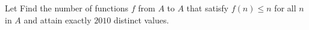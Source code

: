 Let   Find the number of functions $f$ from $A$ to $A$ that satisfy $f(n) \le n$ for all $n$ in $A$ and attain exactly $2010$ distinct values.